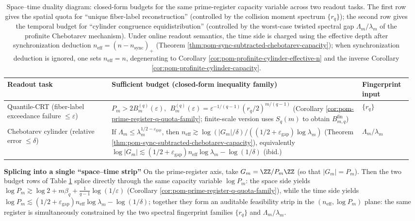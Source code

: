 \begin{table}[H]
\centering
\scriptsize
\setlength{\tabcolsep}{6pt}
\caption{Space--time duality diagram: closed-form budgets for the same prime-register capacity variable across two readout tasks. The first row gives the spatial quota for ``unique fiber-label reconstruction'' (controlled by the collision moment spectrum \(\{r_q\}\)); the second row gives the temporal budget for ``cylinder congruence equidistribution'' (controlled by the worst-case twisted spectral gap \(\Lambda_m/\lambda_m\) of the profinite Chebotarev mechanism). Under online readout semantics, the time side is charged using the effective depth after synchronization deduction \(n_{\mathrm{eff}}=(n-n_{\mathrm{sync}})_+\) (Theorem \ref{thm:pom-sync-subtracted-chebotarev-capacity}); when synchronization deduction is ignored, one sets \(n_{\mathrm{eff}}=n\), degenerating to Corollary \ref{cor:pom-profinite-cylinder-effective-n} and the inverse Corollary \ref{cor:pom-profinite-cylinder-capacity}.}
\label{tab:pom-space-time-duality-prime-register}
\begin{tabular}{p{0.25\linewidth} p{0.60\linewidth} p{0.12\linewidth}}
\toprule
Readout task & Sufficient budget (closed-form inequality family) & Fingerprint input\\
\midrule
Quantile-CRT (fiber-label exceedance failure \(\le\varepsilon\)) &
\(
P_m>2B_m^{(q)}(\varepsilon),
\ \
B_m^{(q)}(\varepsilon)=\varepsilon^{-1/(q-1)}(r_q/2)^{m/(q-1)}
\)
(Corollary \ref{cor:pom-prime-register-q-quota-family}; finite-scale version uses \(S_q(m)\) to obtain \(B_{m,q}^{\mathrm{fin}}\)) &
\(\{r_q\}\)\\

Chebotarev cylinder (relative error \(\le\delta\)) &
If \(\Lambda_m\le \lambda_m^{1/2-\varepsilon_{\mathrm{gap}}}\), then
\(
n_{\mathrm{eff}}\gtrsim \log(|G_m|/\delta)/((1/2+\varepsilon_{\mathrm{gap}})\log\lambda_m)
\)
(Theorem \ref{thm:pom-sync-subtracted-chebotarev-capacity}), equivalently
\(
\log|G_m|\lesssim (1/2+\varepsilon_{\mathrm{gap}})n_{\mathrm{eff}}\log\lambda_m-\log(1/\delta)
\)
(ibid.) &
\(\Lambda_m/\lambda_m\)\\
\bottomrule
\end{tabular}
\end{table}

\noindent\textbf{Splicing into a single ``space--time strip''}
On the prime-register axis, take \(G_m=\ZZ/P_m\ZZ\) (so that \(|G_m|=P_m\)).
Then the two budget rows of Table \ref{tab:pom-space-time-duality-prime-register} splice directly through the same capacity variable \(\log P_m\): the space side yields
\(
\log P_m\gtrsim \log 2+m\beta_q+\frac{1}{q-1}\log(1/\varepsilon)
\)
(Corollary \ref{cor:pom-prime-register-q-quota-family}), while the time side yields
\(
\log P_m\lesssim (1/2+\varepsilon_{\mathrm{gap}})n_{\mathrm{eff}}\log\lambda_m-\log(1/\delta)
\);
together they form an auditable feasibility strip in the \((n_{\mathrm{eff}},\log P_m)\) plane: the same register is simultaneously constrained by the two spectral fingerprint families \(\{r_q\}\) and \(\Lambda_m/\lambda_m\).

